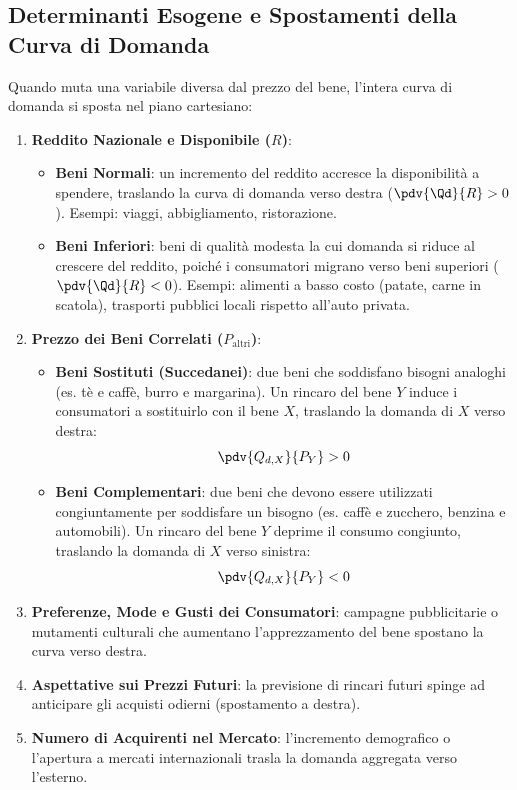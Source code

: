 \subsection{Determinanti Esogene e Spostamenti della Curva di Domanda}
Quando muta una variabile diversa dal prezzo del bene, l'intera curva di domanda si sposta nel piano cartesiano:

\begin{enumerate}
    \item \textbf{Reddito Nazionale e Disponibile ($R$)}:
    \begin{itemize}
        \item \textbf{Beni Normali}: un incremento del reddito accresce la disponibilità a spendere, traslando la curva di domanda verso destra ($\pdv{\Qd}{R} > 0$). Esempi: viaggi, abbigliamento, ristorazione.
        \item \textbf{Beni Inferiori}: beni di qualità modesta la cui domanda si riduce al crescere del reddito, poiché i consumatori migrano verso beni superiori ($\pdv{\Qd}{R} < 0$). Esempi: alimenti a basso costo (patate, carne in scatola), trasporti pubblici locali rispetto all'auto privata.
    \end{itemize}
    
    \item \textbf{Prezzo dei Beni Correlati ($P_{\text{altri}}$)}:
    \begin{itemize}
        \item \textbf{Beni Sostituti (Succedanei)}: due beni che soddisfano bisogni analoghi (es. tè e caffè, burro e margarina). Un rincaro del bene $Y$ induce i consumatori a sostituirlo con il bene $X$, traslando la domanda di $X$ verso destra:
        \begin{equation}
            \pdv{Q_{d,X}}{P_Y} > 0
        \end{equation}
        \item \textbf{Beni Complementari}: due beni che devono essere utilizzati congiuntamente per soddisfare un bisogno (es. caffè e zucchero, benzina e automobili). Un rincaro del bene $Y$ deprime il consumo congiunto, traslando la domanda di $X$ verso sinistra:
        \begin{equation}
            \pdv{Q_{d,X}}{P_Y} < 0
        \end{equation}
    \end{itemize}
    
    \item \textbf{Preferenze, Mode e Gusti dei Consumatori}: campagne pubblicitarie o mutamenti culturali che aumentano l'apprezzamento del bene spostano la curva verso destra.
    \item \textbf{Aspettative sui Prezzi Futuri}: la previsione di rincari futuri spinge ad anticipare gli acquisti odierni (spostamento a destra).
    \item \textbf{Numero di Acquirenti nel Mercato}: l'incremento demografico o l'apertura a mercati internazionali trasla la domanda aggregata verso l'esterno.
\end{enumerate}

